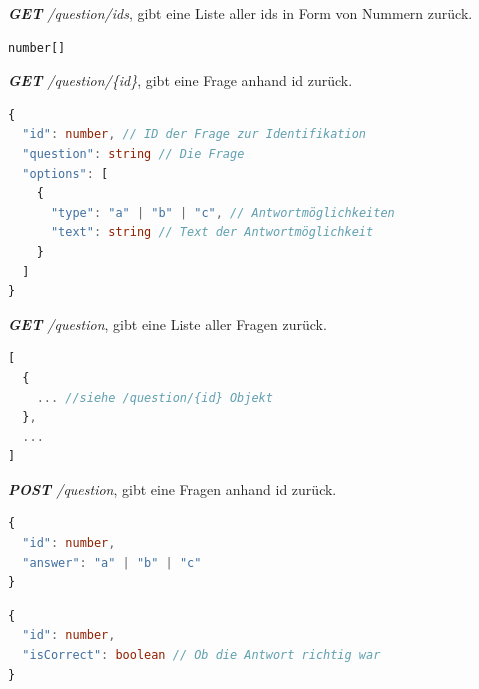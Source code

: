 \documentclass[biblatex]{lni}
\begin{document}
\textit{\textbf{GET} /question/ids}, gibt eine Liste aller ids in Form von Nummern zurück. \\
\begin{lstlisting}[caption={\ac{JSON} der Route \textbf{GET} /type }, label=type, language=typescript]
number[]
\end{lstlisting}

\textit{\textbf{GET} /question/\{id\}}, gibt eine Frage anhand id zurück. \\
\begin{lstlisting}[caption={\ac{JSON} der Route \textbf{GET} /question/\{id\} }, label=get-questionbyid, language=typescript]
{
  "id": number, // ID der Frage zur Identifikation
  "question": string // Die Frage
  "options": [
    {
      "type": "a" | "b" | "c", // Antwortmöglichkeiten
      "text": string // Text der Antwortmöglichkeit
    }
  ]
}
\end{lstlisting}

\textit{\textbf{GET} /question}, gibt eine Liste aller Fragen zurück. \\
\begin{lstlisting}[caption={\ac{JSON} der Route \textbf{GET} /question }, label=get-question, language=typescript]
[
  {
    ... //siehe /question/{id} Objekt
  },
  ...
]
\end{lstlisting}

\textit{\textbf{POST} /question}, gibt eine Fragen anhand id zurück. \\
\begin{lstlisting}[caption={Request \ac{JSON} der Route \textbf{POST} /question }, label=post-question-req, language=typescript]
{
  "id": number,
  "answer": "a" | "b" | "c"
}
\end{lstlisting}
\begin{lstlisting}[caption={Response \ac{JSON} der Route \textbf{POST} /question }, label=post-question-res, language=typescript]
{
  "id": number,
  "isCorrect": boolean // Ob die Antwort richtig war
}
\end{lstlisting}
\end{document}
